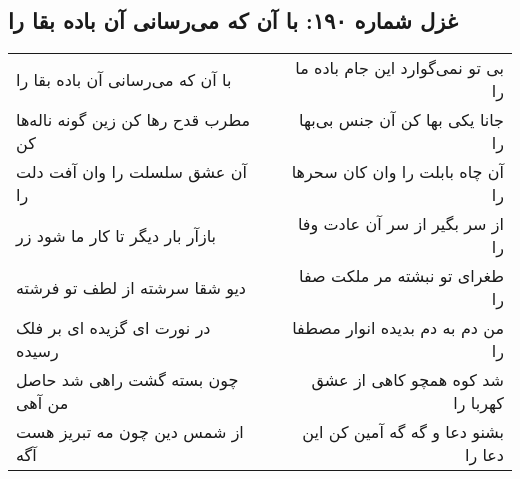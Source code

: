\begin{center}
\section*{غزل شماره ۱۹۰: با آن که می‌رسانی آن باده بقا را}
\label{sec:0190}
\begin{longtable}{l p{0.5cm} r}
با آن که می‌رسانی آن باده بقا را
&&
بی تو نمی‌گوارد این جام باده ما را
\\
مطرب قدح رها کن زین گونه ناله‌ها کن
&&
جانا یکی بها کن آن جنس بی‌بها را
\\
آن عشق سلسلت را وان آفت دلت را
&&
آن چاه بابلت را وان کان سحرها را
\\
بازآر بار دیگر تا کار ما شود زر
&&
از سر بگیر از سر آن عادت وفا را
\\
دیو شقا سرشته از لطف تو فرشته
&&
طغرای تو نبشته مر ملکت صفا را
\\
در نورت ای گزیده ای بر فلک رسیده
&&
من دم به دم بدیده انوار مصطفا را
\\
چون بسته گشت راهی شد حاصل من آهی
&&
شد کوه همچو کاهی از عشق کهربا را
\\
از شمس دین چون مه تبریز هست آگه
&&
بشنو دعا و گه گه آمین کن این دعا را
\\
\end{longtable}
\end{center}
